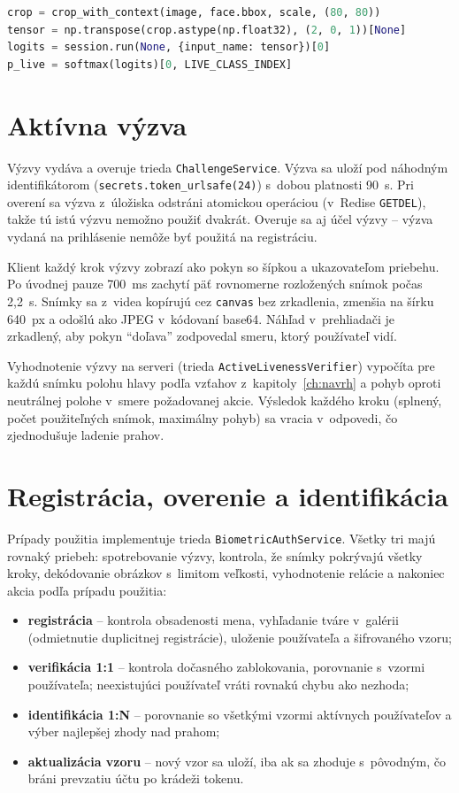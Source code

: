 \begin{lstlisting}[language=Python, caption={Predspracovanie a inferencia jedného modelu (zjednodušené)}]
crop = crop_with_context(image, face.bbox, scale, (80, 80))
tensor = np.transpose(crop.astype(np.float32), (2, 0, 1))[None]
logits = session.run(None, {input_name: tensor})[0]
p_live = softmax(logits)[0, LIVE_CLASS_INDEX]
\end{lstlisting}

\section{Aktívna výzva}

Výzvy vydáva a overuje trieda \texttt{ChallengeService}. Výzva sa uloží pod náhodným
identifikátorom (\texttt{secrets.token\_urlsafe(24)}) s~dobou platnosti 90~s. Pri
overení sa výzva z~úložiska odstráni atomickou operáciou (v~Redise \texttt{GETDEL}),
takže tú istú výzvu nemožno použiť dvakrát. Overuje sa aj účel výzvy -- výzva vydaná na
prihlásenie nemôže byť použitá na registráciu.

Klient každý krok výzvy zobrazí ako pokyn so šípkou a ukazovateľom priebehu. Po
úvodnej pauze 700~ms zachytí päť rovnomerne rozložených snímok počas 2,2~s. Snímky sa
z~videa kopírujú cez \texttt{canvas} bez zrkadlenia, zmenšia na šírku 640~px a odošlú ako
JPEG v~kódovaní base64. Náhľad v~prehliadači je zrkadlený, aby pokyn \enquote{doľava}
zodpovedal smeru, ktorý používateľ vidí.

Vyhodnotenie výzvy na serveri (trieda \texttt{ActiveLivenessVerifier}) vypočíta pre
každú snímku polohu hlavy podľa vzťahov z~kapitoly~\ref{ch:navrh} a pohyb oproti
neutrálnej polohe v~smere požadovanej akcie. Výsledok každého kroku (splnený,
počet použiteľných snímok, maximálny pohyb) sa vracia v~odpovedi, čo zjednodušuje
ladenie prahov.

\section{Registrácia, overenie a identifikácia}

Prípady použitia implementuje trieda \texttt{BiometricAuthService}. Všetky tri majú
rovnaký priebeh: spotrebovanie výzvy, kontrola, že snímky pokrývajú všetky kroky,
dekódovanie obrázkov s~limitom veľkosti, vyhodnotenie relácie a nakoniec akcia
podľa prípadu použitia:
\begin{itemize}
  \item \textbf{registrácia} -- kontrola obsadenosti mena, vyhľadanie tváre v~galérii
        (odmietnutie duplicitnej registrácie), uloženie používateľa a šifrovaného vzoru;
  \item \textbf{verifikácia 1:1} -- kontrola dočasného zablokovania, porovnanie
        s~vzormi používateľa; neexistujúci používateľ vráti rovnakú chybu ako nezhoda;
  \item \textbf{identifikácia 1:N} -- porovnanie so všetkými vzormi aktívnych
        používateľov a výber najlepšej zhody nad prahom;
  \item \textbf{aktualizácia vzoru} -- nový vzor sa uloží, iba ak sa zhoduje
        s~pôvodným, čo bráni prevzatiu účtu po krádeži tokenu.
\end{itemize}

